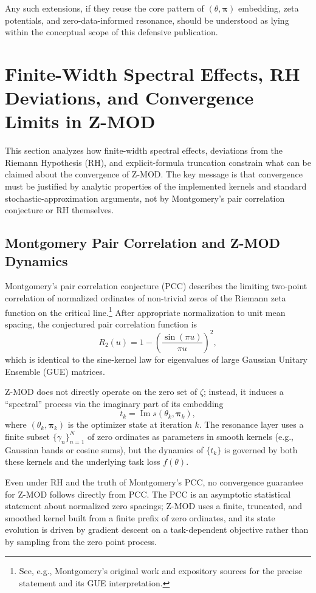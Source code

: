 \documentclass[11pt]{article}
\begin{document}
Any such extensions, if they reuse the core pattern of $(\theta,\bm{\pi})$ embedding, zeta potentials, and zero-data-informed resonance, should be understood as lying within the conceptual scope of this defensive publication.

\section{Finite-Width Spectral Effects, RH Deviations, and Convergence Limits in Z-MOD}
\label{sec:finite_width_rh_convergence}

This section analyzes how finite-width spectral effects, deviations from the Riemann Hypothesis (RH), and explicit-formula truncation constrain what can be claimed about the convergence of Z-MOD. The key message is that convergence must be justified by analytic properties of the implemented kernels and standard stochastic-approximation arguments, not by Montgomery's pair correlation conjecture or RH themselves.

\subsection{Montgomery Pair Correlation and Z-MOD Dynamics}

Montgomery's pair correlation conjecture (PCC) describes the limiting two-point correlation of normalized ordinates of non-trivial zeros of the Riemann zeta function on the critical line.\footnote{See, e.g., Montgomery's original work and expository sources for the precise statement and its GUE interpretation.} After appropriate normalization to unit mean spacing, the conjectured pair correlation function is
\[
  R_2(u) = 1 - \left(\frac{\sin(\pi u)}{\pi u}\right)^2,
\]
which is identical to the sine-kernel law for eigenvalues of large Gaussian Unitary Ensemble (GUE) matrices.

Z-MOD does not directly operate on the zero set of $\zeta$; instead, it induces a ``spectral'' process via the imaginary part of its embedding
\[
  t_k = \operatorname{Im}s(\theta_k,\bm{\pi}_k),
\]
where $(\theta_k,\bm{\pi}_k)$ is the optimizer state at iteration $k$. The resonance layer uses a finite subset $\{\gamma_n\}_{n=1}^N$ of zero ordinates as parameters in smooth kernels (e.g., Gaussian bands or cosine sums), but the dynamics of $\{t_k\}$ is governed by both these kernels and the underlying task loss $f(\theta)$.

\begin{lemma}
Even under RH and the truth of Montgomery's PCC, no convergence guarantee for Z-MOD follows directly from PCC. The PCC is an asymptotic statistical statement about normalized zero spacings; Z-MOD uses a finite, truncated, and smoothed kernel built from a finite prefix of zero ordinates, and its state evolution is driven by gradient descent on a task-dependent objective rather than by sampling from the zero point process.
\end{lemma}
\end{document}
